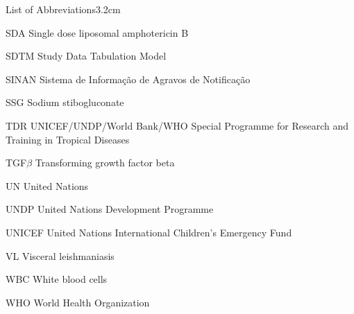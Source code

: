 \begin{mclistof}{List of Abbreviations}{3.2cm}
  \item[SDA] Single dose liposomal amphotericin B
  \item[SDTM] Study Data Tabulation Model
  \item[SINAN] Sistema de Informação de Agravos de Notificação
  \item[SSG] Sodium stibogluconate
  \item[TDR] UNICEF/UNDP/World Bank/WHO Special Programme for Research and Training in Tropical Diseases
  \item[TGF$\beta$] Transforming growth factor beta
  \item[UN] United Nations
  \item[UNDP] United Nations Development Programme
  \item[UNICEF] United Nations International Children's Emergency Fund
  \item[VL] Visceral leishmaniasis
  \item[WBC] White blood cells
  \item[WHO] World Health Organization
\end{mclistof}